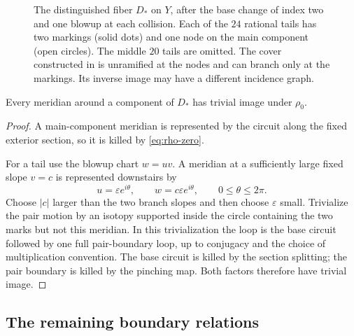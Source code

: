 \begin{figure}[htbp]
\centering
{}
\caption{The distinguished fiber $D_*$ on $Y$, after the base change of index two and
one blowup at each collision. Each of the $24$ rational tails has two
markings (solid dots) and one node on the main component (open circles).
The middle $20$ tails are omitted. The cover constructed in 
is unramified at the nodes and can branch only at the markings. Its
inverse image may have a different incidence graph.}
\label{fig:distinguished-fiber}
\end{figure}


\begin{lemma}\label{lem:distinguished-meridians}
Every meridian around a component of $D_*$ has trivial image under $\rho_0$.
\end{lemma}

\begin{proof}
A main-component meridian is represented by the circuit along the fixed exterior section, so it is killed by \eqref{eq:rho-zero}.

For a tail use the blowup chart $w=uv$. A meridian at a sufficiently large fixed slope $v=c$ is represented downstairs by
\[
 u=\varepsilon e^{i\theta},\qquad
 w=c\varepsilon e^{i\theta},\qquad 0\le\theta\le2\pi.
\]
Choose $|c|$ larger than the two branch slopes and then choose $\varepsilon$ small. Trivialize the pair motion by an isotopy supported inside the circle containing the two marks but not this meridian. In this trivialization the loop is the base circuit followed by one full pair-boundary loop, up to conjugacy and the choice of multiplication convention. The base circuit is killed by the section splitting; the pair boundary is killed by the pinching map. Both factors therefore have trivial image.
\end{proof}

\subsection{The remaining boundary relations}

